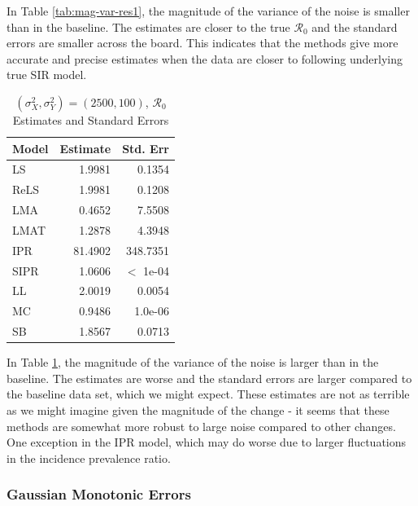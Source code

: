 \documentclass[12pt]{article}
\newcommand{\rr}{\ensuremath{\mathcal{R}_0}}
\begin{document}
In Table \ref{tab:mag-var-res1}, the magnitude of the variance of the noise is smaller than in the baseline. The estimates are closer to the true $\rr$ and the standard errors are smaller across the board. This indicates that the methods give more accurate and precise estimates when the data are closer to following underlying true SIR model.


\begin{table}[H]
	

	\centering
	\begin{tabular}[t]{l|r|r}
		\hline
		Model & Estimate & Std. Err\\
		\hline
		LS & 1.9981 & 0.1354\\
		\hline
		ReLS & 1.9981 & 0.1208\\
		\hline
		LMA & 0.4652 & 7.5508\\
		\hline
		LMAT & 1.2878 & 4.3948\\
		\hline
		IPR & 81.4902 & 348.7351\\
		\hline
		SIPR & 1.0606 & $<$ 1e-04\\
		\hline
		LL & 2.0019 & 0.0054\\
		\hline
		MC & 0.9486 & 1.0e-06\\
		\hline
		SB & 1.8567 & 0.0713\\
		\hline
	\end{tabular}
        	\caption{$(\sigma^2_X, \sigma^2_Y) = (2500, 100)$, $\rr$ Estimates and Standard Errors}\label{tab:mag-var-res2}
\end{table}

In Table \ref{tab:mag-var-res2}, the magnitude of the variance of the noise is larger than in the baseline. The estimates are worse and the standard errors are larger compared to the baseline data set, which we might expect. These estimates are not as terrible as we might imagine given the magnitude of the change - it seems that these methods are somewhat more robust to large noise compared to other changes. One exception in the IPR model, which may do worse due to larger fluctuations in the incidence prevalence ratio. 

\subsubsection{Gaussian Monotonic Errors}
\end{document}
